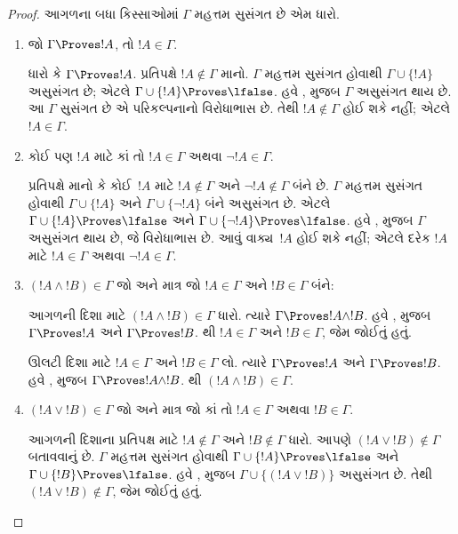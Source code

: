 \begin{proof}
આગળના બધા કિસ્સાઓમાં
$\Gamma$ મહત્તમ સુસંગત
છે એમ ધારો.
\begin{enumerate}
\item જો $\Gamma \Proves !A$, તો $!A \in \Gamma$.

ધારો કે $\Gamma \Proves !A$.
પ્રતિપક્ષે $!A \notin \Gamma$
માનો. $\Gamma$ મહત્તમ
સુસંગત હોવાથી
$\Gamma \cup \{!A\}$
અસુસંગત છે; એટલે
$\Gamma \cup \{!A\} \Proves
\lfalse$. હવે
,
મુજબ $\Gamma$ અસુસંગત
થાય છે. આ $\Gamma$
સુસંગત છે એ
પરિકલ્પનાનો વિરોધાભાસ
છે. તેથી $!A \notin
\Gamma$ હોઈ શકે નહીં;
એટલે $!A \in \Gamma$.

\item કોઈ પણ $!A$ માટે કાં તો $!A \in \Gamma$
અથવા $\lnot !A \in \Gamma$.

પ્રતિપક્ષે માનો કે કોઈ~$!A$
માટે $!A \notin \Gamma$
અને $\lnot !A \notin \Gamma$
બંને છે. $\Gamma$
મહત્તમ સુસંગત હોવાથી
$\Gamma \cup \{!A\}$
અને $\Gamma \cup \{\lnot !A\}$
બંને અસુસંગત છે.
એટલે $\Gamma \cup \{!A\} \Proves \lfalse$
અને $\Gamma \cup
\{\lnot !A\} \Proves \lfalse$.
હવે
,
મુજબ $\Gamma$ અસુસંગત
થાય છે, જે વિરોધાભાસ છે.
આવું વાક્ય~$!A$
હોઈ શકે નહીં; એટલે
દરેક $!A$ માટે
$!A \in \Gamma$ અથવા
$\lnot !A \in \Gamma$.

\item %
%
$(!A \land !B) \in \Gamma$ જો અને માત્ર જો
$!A \in \Gamma$ અને $!B \in \Gamma$ બંને:

આગળની દિશા માટે
$(!A \land !B) \in \Gamma$
ધારો. ત્યારે
$\Gamma \Proves !A \land !B$.
હવે
,
મુજબ $\Gamma \Proves !A$
અને $\Gamma \Proves !B$.
થી
$!A \in \Gamma$ અને
$!B \in \Gamma$,
જેમ જોઈતું હતું.

ઊલટી દિશા માટે
$!A \in \Gamma$ અને
$!B \in \Gamma$ લો.
ત્યારે $\Gamma \Proves !A$
અને $\Gamma \Proves !B$.
હવે
,
મુજબ $\Gamma \Proves !A \land !B$.
થી
$(!A \land
!B) \in \Gamma$.

\item %
%
$(!A \lor !B) \in \Gamma$ જો અને માત્ર જો
કાં તો $!A \in \Gamma$ અથવા $!B \in \Gamma$.

આગળની દિશાના પ્રતિપક્ષ
માટે $!A \notin \Gamma$
અને $!B \notin \Gamma$
ધારો. આપણે $(!A \lor
!B) \notin \Gamma$
બતાવવાનું છે. $\Gamma$
મહત્તમ સુસંગત હોવાથી
$\Gamma \cup \{!A\} \Proves \lfalse$
અને $\Gamma \cup \{!B\} \Proves \lfalse$.
હવે
,
મુજબ $\Gamma \cup \{(!A \lor !B)\}$
અસુસંગત છે. તેથી
$(!A \lor !B) \notin \Gamma$,
જેમ જોઈતું હતું.


\end{enumerate}
\end{proof}
